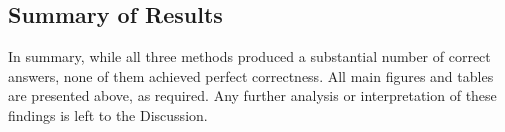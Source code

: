 \subsection{Summary of Results}

In summary, while all three methods produced a substantial number of correct answers, none of them achieved perfect correctness. All main figures and tables are presented above, as required. Any further analysis or interpretation of these findings is left to the Discussion.